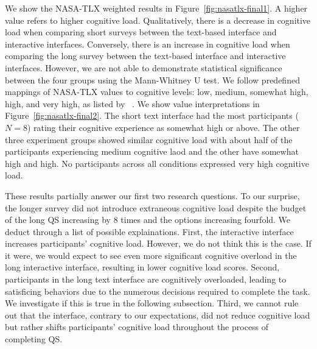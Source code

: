 We show the NASA-TLX weighted results in Figure~\ref{fig:nasatlx-final1}. A higher value refers to higher cognitive load. Qualitatively, there is a decrease in cognitive load when comparing short surveys between the text-based interface and interactive interfaces. Conversely, there is an increase in cognitive load when comparing the long survey between the text-based interface and interactive interfaces. However, we are not able to demonstrate statistical significance between the four groups using the Mann-Whitney U test. We follow predefined mappings of NASA-TLX values to cognitive levels: low, medium, somewhat high, high, and very high, as listed by ~\textcite{hart1988development}. We show value interpretations in Figure~\ref{fig:nasatlx-final2}. The short text interface had the most participants ($N=8$) rating their cognitive experience as somewhat high or above. The other three experiment groups showed similar cognitive load with about half of the participants experiencing medium cognitive laod and the other have somewhat high and high. No participants across all conditions expressed very high cognitive load.

These results partially answer our first two research questions. To our surprise, the longer survey did not introduce extraneous cognitive load despite the budget of the long QS increasing by 8 times and the options increasing fourfold. We deduct through a list of possible explainations. First, the interactive interface increases participants' cognitive load. However, we do not think this is the case. If it were, we would expect to see even more significant cognitive overload in the long interactive interface, resulting in lower cognitive load scores. Second, participants in the long text interface are cognitively overloaded, leading to satisficing behaviors due to the numerous decisions required to complete the task. We investigate if this is true in the following subsection. Third, we cannot rule out that the interface, contrary to our expectations, did not reduce cognitive load but rather shifts participants' cognitive load throughout the process of completing QS.

